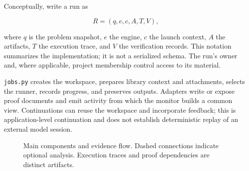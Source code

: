 \documentclass[10pt,letterpaper]{article}
\begin{document}
Conceptually, write a run as

\[
R=(q,e,c,A,T,V),
\]

where $q$ is the problem snapshot, $e$ the engine, $c$ the launch context, $A$ the artifacts, $T$ the execution trace, and $V$ the verification records. This notation summarizes the implementation; it is not a serialized schema. The run's owner and, where applicable, project membership control access to its material.

\nolinkurl{jobs.py} creates the workspace, prepares library context and attachments, selects the runner, records progress, and preserves outputs. Adapters write or expose proof documents and emit activity from which the monitor builds a common view. Continuations can reuse the workspace and incorporate feedback; this is application-level continuation and does not establish deterministic replay of an external model session.


\begin{figure}[htbp]
\centering
{}
\caption{Main components and evidence flow. Dashed connections indicate
optional analysis. Execution traces and proof dependencies are distinct artifacts.}
\end{figure}
\end{document}
